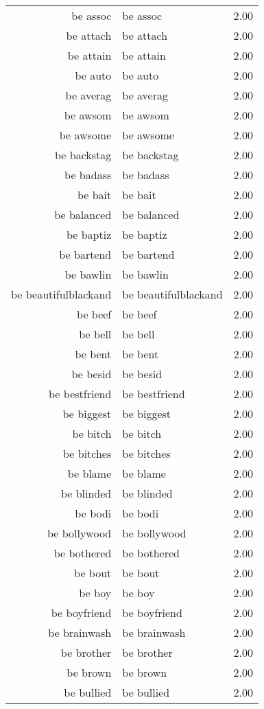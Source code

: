 \begin{table}[ht]
\begin{tabular}{rlr}
  be assoc & be assoc & 2.00 \\ 
  be attach & be attach & 2.00 \\ 
  be attain & be attain & 2.00 \\ 
  be auto & be auto & 2.00 \\ 
  be averag & be averag & 2.00 \\ 
  be awsom & be awsom & 2.00 \\ 
  be awsome & be awsome & 2.00 \\ 
  be backstag & be backstag & 2.00 \\ 
  be badass & be badass & 2.00 \\ 
  be bait & be bait & 2.00 \\ 
  be balanced & be balanced & 2.00 \\ 
  be baptiz & be baptiz & 2.00 \\ 
  be bartend & be bartend & 2.00 \\ 
  be bawlin & be bawlin & 2.00 \\ 
  be beautifulblackand & be beautifulblackand & 2.00 \\ 
  be beef & be beef & 2.00 \\ 
  be bell & be bell & 2.00 \\ 
  be bent & be bent & 2.00 \\ 
  be besid & be besid & 2.00 \\ 
  be bestfriend & be bestfriend & 2.00 \\ 
  be biggest & be biggest & 2.00 \\ 
  be bitch & be bitch & 2.00 \\ 
  be bitches & be bitches & 2.00 \\ 
  be blame & be blame & 2.00 \\ 
  be blinded & be blinded & 2.00 \\ 
  be bodi & be bodi & 2.00 \\ 
  be bollywood & be bollywood & 2.00 \\ 
  be bothered & be bothered & 2.00 \\ 
  be bout & be bout & 2.00 \\ 
  be boy & be boy & 2.00 \\ 
  be boyfriend & be boyfriend & 2.00 \\ 
  be brainwash & be brainwash & 2.00 \\ 
  be brother & be brother & 2.00 \\ 
  be brown & be brown & 2.00 \\ 
  be bullied & be bullied & 2.00 \\ 

\end{tabular}
\end{table}
